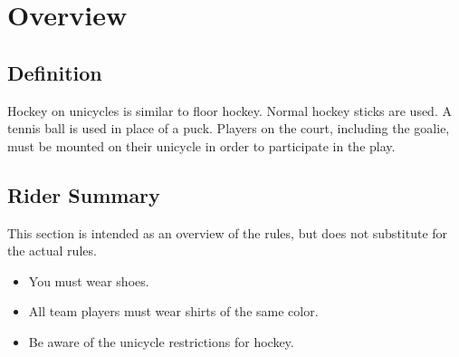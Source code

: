 \chapter{Overview}

\section{Definition}

Hockey on unicycles is similar to floor hockey.
Normal hockey sticks are used.
A tennis ball is used in place of a puck.
Players on the court, including the goalie, must be mounted on their unicycle in order to participate in the play.

\section{Rider Summary}

This section is intended as an overview of the rules, but does not substitute for the actual rules.
\begin{itemize}
\item You must wear shoes.
\item All team players must wear shirts of the same color.
\item Be aware of the unicycle restrictions for hockey.
\end{itemize}
